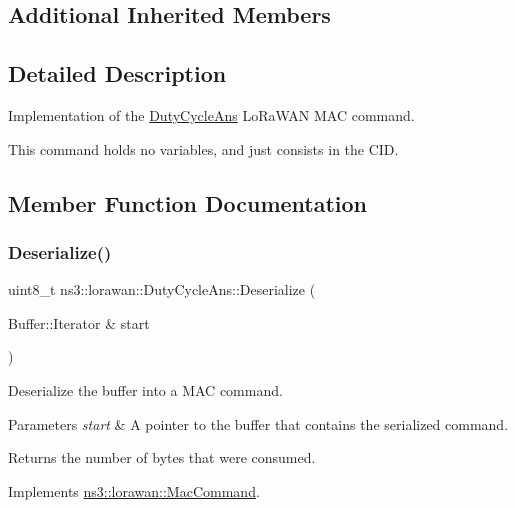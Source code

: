 \subsection*{Additional Inherited Members}


\subsection{Detailed Description}
Implementation of the \hyperlink{classns3_1_1lorawan_1_1DutyCycleAns}{Duty\+Cycle\+Ans} Lo\+Ra\+W\+AN M\+AC command.

This command holds no variables, and just consists in the C\+ID. 

\subsection{Member Function Documentation}
\mbox{\label{classns3_1_1lorawan_1_1DutyCycleAns_aa3157f0326048cb774c8cfeb0f6d35a7}} 
\subsubsection{\texorpdfstring{Deserialize()}{Deserialize()}}
{\footnotesize\ttfamily uint8\+\_\+t ns3\+::lorawan\+::\+Duty\+Cycle\+Ans\+::\+Deserialize (\begin{DoxyParamCaption}\item[{Buffer\+::\+Iterator \&}]{start }\end{DoxyParamCaption})\hspace{0.3cm}{\ttfamily [virtual]}}

Deserialize the buffer into a M\+AC command.


\begin{DoxyParams}{Parameters}
{\em start} & A pointer to the buffer that contains the serialized command. \\
\hline
\end{DoxyParams}
\begin{DoxyReturn}{Returns}
the number of bytes that were consumed. 
\end{DoxyReturn}


Implements \hyperlink{classns3_1_1lorawan_1_1MacCommand_af12d223a71a67196bce498f1240eda75}{ns3\+::lorawan\+::\+Mac\+Command}.

